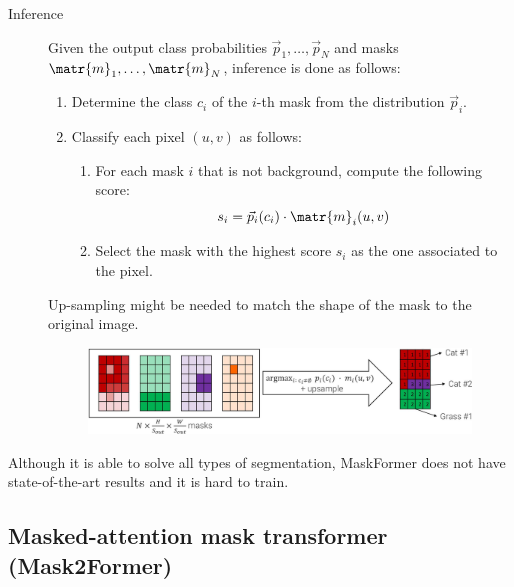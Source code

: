 \begin{description}
\begin{description}
            \item[Inference]
                Given the output class probabilities $\vec{p}_1, \dots, \vec{p}_N$ and masks $\matr{m}_1, \dots, \matr{m}_N$, inference is done as follows:
                \begin{enumerate}
                    \item Determine the class $c_i$ of the $i$-th mask from the distribution $\vec{p}_i$.
                    \item Classify each pixel $(u, v)$ as follows:
                    \begin{enumerate}
                        \item For each mask $i$ that is not background, compute the following score:
                        \[ s_i = \vec{p}_i(c_i) \cdot \matr{m}_i(u, v) \]
                        \item Select the mask with the highest score $s_i$ as the one associated to the pixel.
                    \end{enumerate}
                \end{enumerate}

                \begin{remark}
                    Up-sampling might be needed to match the shape of the mask to the original image.
                \end{remark}

                \begin{figure}[H]
                    \centering
                    \includegraphics[width=0.8\linewidth]{./img/_maskformer_inference.jpg}
                \end{figure}
        \end{description}

    \begin{remark}
        Although it is able to solve all types of segmentation, MaskFormer does not have state-of-the-art results and it is hard to train.
    \end{remark}
\end{description}


\subsection{Masked-attention mask transformer (Mask2Former)}

